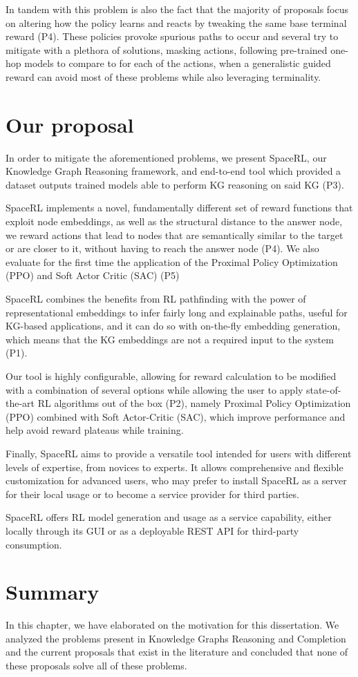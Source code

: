 In tandem with this problem is also the fact that the majority of proposals focus on altering how the policy learns and reacts by tweaking the same base terminal reward (P4). These policies provoke spurious paths to occur and several \cite{} try to mitigate with a plethora of solutions, masking actions, following pre-trained one-hop models to compare to for each of the actions, when a generalistic guided reward can avoid most of these problems while also leveraging terminality.

\section{Our proposal}\label{sec:moti-proposal}
In order to mitigate the aforementioned problems, we present SpaceRL, our Knowledge Graph Reasoning framework, and end-to-end tool which provided a dataset outputs trained models able to perform KG reasoning on said KG (P3).

SpaceRL implements a novel, fundamentally different set of reward functions that exploit node embeddings, as well as the structural distance to the answer node, we reward actions that lead to nodes that are semantically similar to the target or are closer to it, without having to reach the answer node (P4). We also evaluate for the first time the application of the Proximal Policy Optimization (PPO) and Soft Actor Critic (SAC) (P5)

SpaceRL combines the benefits from RL pathfinding with the power of representational embeddings to infer fairly long and explainable paths, useful for KG-based applications, and it can do so with on-the-fly embedding generation, which means that the KG embeddings are not a required input to the system (P1).

Our tool is highly configurable, allowing for reward calculation to be modified with a combination of several options while allowing the user to apply state-of-the-art RL algorithms out of the box (P2), namely Proximal Policy Optimization (PPO)\cite{schulman2017proximal} combined with Soft Actor-Critic (SAC)\cite{haarnoja2018soft}, which improve performance and help avoid reward plateaus while training.

Finally, SpaceRL aims to provide a versatile tool intended for users with different levels of expertise, from novices to experts. It allows comprehensive and flexible customization for advanced users, who may prefer to install SpaceRL as a server for their local usage or to become a service provider for third parties.

SpaceRL offers RL model generation and usage as a service capability, either locally through its GUI or as a deployable REST API for third-party consumption. 

\section{Summary}\label{sec:moti-summary}
In this chapter, we have elaborated on the motivation for this dissertation. We analyzed the problems present in Knowledge Graphs Reasoning and Completion and the current proposals that exist in the literature and concluded that none of these proposals solve all of these problems.